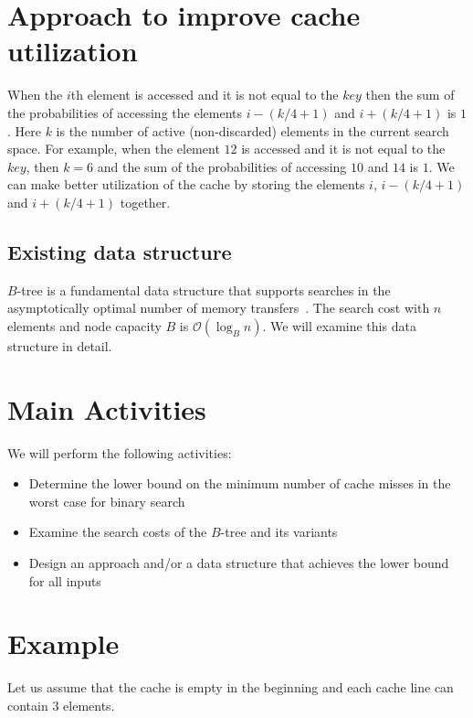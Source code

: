 \documentclass[11pt,a4]{article}
\begin{document}
\newpage

\vspace*{0.1cm}
\section*{Approach to improve cache utilization}
When the $i$th element is accessed and it is not equal to the $key$ then the sum of the probabilities of accessing the elements $i-(k/4+1)$ and $i+(k/4+1)$ is $1$. Here $k$ is the number of active (non-discarded) elements in the current search space. For example, when the element $12$ is accessed and it is not equal to the $key$, then $k=6$ and the sum of the probabilities of accessing $10$ and $14$ is $1$. We can make better utilization of the cache by storing the elements $i$, $i-(k/4+1)$ and $i+(k/4+1)$ together.


\subsection*{Existing data structure}
$B$-tree is a fundamental  data structure that supports searches in the asymptotically optimal number of memory transfers~\cite{Frigo1999,Tomohiro2025}. The search cost with $n$ elements and node capacity $B$ is \(\mathcal{O}(\log_B n)\). We will examine this data structure in detail.




\section*{Main Activities}

We will perform the following activities:
\begin{itemize}
	\item[$\bullet$] Determine the lower bound on the minimum number of cache misses in the worst case for binary search
	\item[$\bullet$] Examine the search costs of the $B$-tree and its variants 
	\item[$\bullet$] Design an approach and/or a data structure that achieves the lower bound for all inputs
\end{itemize}


\section*{Example}
Let us assume that the cache is empty in the beginning and each cache line can contain $3$ elements. 
\end{document}
